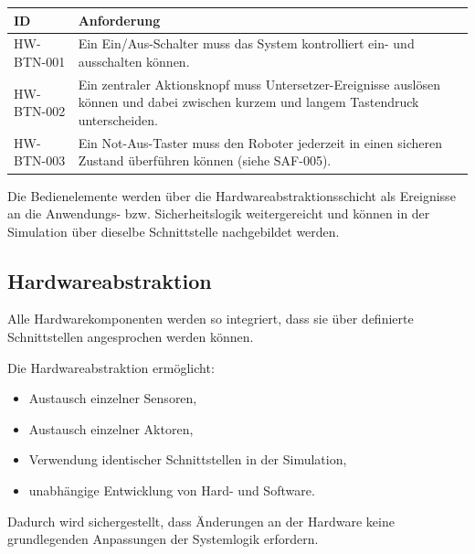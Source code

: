 \begin{longtable}[]{@{}
  >{\raggedright\arraybackslash}p{}
  >{\raggedright\arraybackslash}p{}@{}}
\toprule\noalign{}
\begin{minipage}[b]{\linewidth}\raggedright
ID
\end{minipage} & \begin{minipage}[b]{\linewidth}\raggedright
Anforderung
\end{minipage} \\
\midrule\noalign{}
\endhead
\bottomrule\noalign{}
\endlastfoot
HW-BTN-001 & Ein Ein/Aus-Schalter muss das System kontrolliert ein- und
ausschalten können. \\
HW-BTN-002 & Ein zentraler Aktionsknopf muss Untersetzer-Ereignisse
auslösen können und dabei zwischen kurzem und langem Tastendruck
unterscheiden. \\
HW-BTN-003 & Ein Not-Aus-Taster muss den Roboter jederzeit in einen
sicheren Zustand überführen können (siehe SAF-005). \\
\end{longtable}

Die Bedienelemente werden über die Hardwareabstraktionsschicht als
Ereignisse an die Anwendungs- bzw. Sicherheitslogik weitergereicht und
können in der Simulation über dieselbe Schnittstelle nachgebildet
werden.

\subsection{Hardwareabstraktion}\label{hardwareabstraktion}

Alle Hardwarekomponenten werden so integriert, dass sie über definierte
Schnittstellen angesprochen werden können.

Die Hardwareabstraktion ermöglicht:

\begin{itemize}
\tightlist
\item
  Austausch einzelner Sensoren,
\item
  Austausch einzelner Aktoren,
\item
  Verwendung identischer Schnittstellen in der Simulation,
\item
  unabhängige Entwicklung von Hard- und Software.
\end{itemize}

Dadurch wird sichergestellt, dass Änderungen an der Hardware keine
grundlegenden Anpassungen der Systemlogik erfordern.

